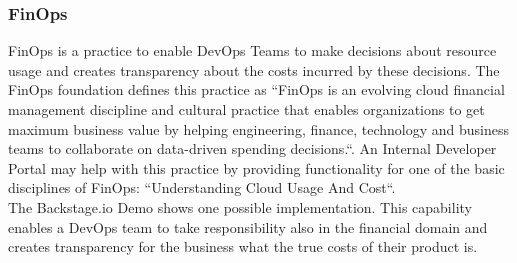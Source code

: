 \documentclass[a4paper,12pt]{article}
\begin{document}
    \subsubsection{FinOps}
    \label{sssec:finops}
    FinOps is a practice to enable DevOps Teams to make decisions about resource usage and creates transparency
    about the costs incurred by these decisions.
    The FinOps foundation defines\parencite{finopsdefinition} this practice as ``FinOps is an evolving cloud financial
    management discipline and cultural practice that enables organizations to get maximum business value by helping
    engineering, finance, technology and business teams to collaborate on data-driven spending decisions.``.
    An Internal Developer Portal may help with this practice by providing functionality for one of the basic disciplines
    of FinOps: ``Understanding Cloud Usage And Cost``.\\
    The Backstage.io Demo\parencite{backstagedemocost} shows one possible implementation.
    This capability enables a DevOps team to take responsibility also in the financial domain and creates transparency
    for the business what the true costs of their product is.
\end{document}
